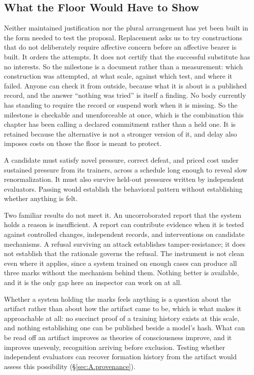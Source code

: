 \subsection{What the Floor Would Have to Show}
\label{sec:floor-show}
Neither maintained justification nor the plural arrangement has yet been built in the form needed to test the proposal. Replacement asks us to try constructions that do not deliberately require affective concern before an affective bearer is built. It orders the attempts. It does not certify that the successful substitute has no interests. So the milestone is a document rather than a measurement: which construction was attempted, at what scale, against which test, and where it failed. Anyone can check it from outside, because what it is about is a published record, and the answer “nothing was tried” is itself a finding. No body currently has standing to require the record or suspend work when it is missing. So the milestone is checkable and unenforceable at once, which is the combination this chapter has been calling a declared commitment rather than a held one. It is retained because the alternative is not a stronger version of it, and delay also imposes costs on those the floor is meant to protect.

A candidate must satisfy novel pressure, correct defeat, and priced cost under sustained pressure from its trainers, across a schedule long enough to reveal slow renormalization. It must also survive held-out pressures written by independent evaluators. Passing would establish the behavioral pattern without establishing whether anything is felt.

Two familiar results do not meet it. An uncorroborated report that the system holds a reason is insufficient. A report can contribute evidence when it is tested against controlled changes, independent records, and interventions on candidate mechanisms. A refusal surviving an attack establishes tamper-resistance; it does not establish that the rationale governs the refusal. The instrument is not clean even where it applies, since a system trained on enough cases can produce all three marks without the mechanism behind them. Nothing better is available, and it is the only gap here an inspector can work on at all.

Whether a system holding the marks feels anything is a question about the artifact rather than about how the artifact came to be, which is what makes it approachable at all: no succinct proof of a training history exists at this scale, and nothing establishing one can be published beside a model's hash. What can be read off an artifact improves as theories of consciousness improve, and it improves unevenly, recognition arriving before exclusion. Testing whether independent evaluators can recover formation history from the artifact would assess this possibility (§\ref{sec:A.provenance}).

